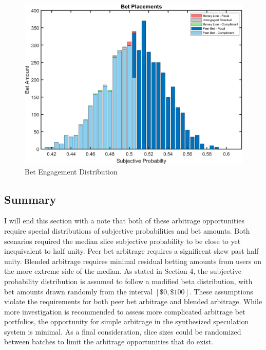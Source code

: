 \documentclass[sn-mathphys-num]{sn-jnl}
\theoremstyle{thmstyleone}%
\theoremstyle{thmstyletwo}%
\theoremstyle{thmstylethree}%
\begin{document}
\begin{figure}[H]
	\centering
	\includegraphics[width=13cm]{Bet Engagement Outcomes}
	\caption{Bet Engagement Distribution}
\end{figure}

\subsection{Summary}

I will end this section with a note that both of these arbitrage opportunities require special distributions of subjective probabilities and bet amounts. Both scenarios required the median slice subjective probability to be close to yet inequivalent to half unity. Peer bet arbitrage requires a significent skew past half unity. Blended arbitrage requires minimal residual betting amounts from users on the more extreme side of the median. As stated in Section 4, the subjective probability distribution is assumed to follow a modified beta distribution, with bet amounts drawn randomly from the interval $[\$0,\$100]$. These assumptions violate the requirements for both peer bet arbitrage and blended arbitrage. While more investigation is recommended to assess more complicated arbitrage bet portfolios, the opportunity for simple arbitrage in the synthesized speculation system is minimal. As a final consideration, slice sizes could be randomized between batches to limit the arbitrage opportunities that do exist.
\end{document}
